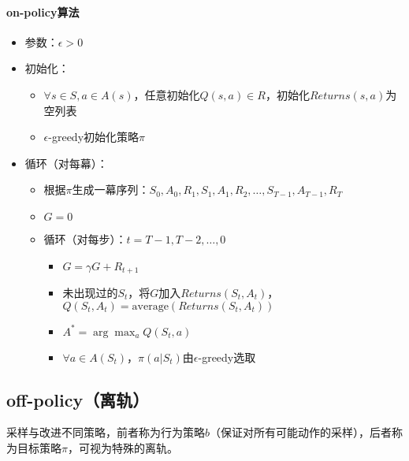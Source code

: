 \documentclass[
12pt, %
a4paper, 
oneside, %
headinclude,footinclude, %
]{scrartcl}
\begin{document}
\paragraph{on-policy算法}
\begin{itemize}
\item 参数：$ \epsilon > 0 $
\item 初始化：
\begin{itemize}
\item $ \forall s \in S, a \in A(s) $，任意初始化$ Q(s,a) \in R $，初始化$ Returns(s,a) $为空列表
\item $ \epsilon $-greedy初始化策略$ \pi $
\end{itemize}
\item 循环（对每幕）：
\begin{itemize}
\item 根据$ \pi $生成一幕序列：$ S_0,A_0,R_1,S_1,A_1,R_2,\dots,S_{T - 1},A_{T - 1},R_T $
\item $ G = 0 $
\item 循环（对每步）：$ t = T - 1, T - 2, \dots, 0 $
\begin{itemize}
\item $ G = \gamma G + R_{t + 1} $ 
\item 未出现过的$ S_t $，将$ G $加入$ Returns(S_t,A_t) $，$ Q(S_t,A_t) = \text{average}(Returns(S_t,A_t)) $
\item $ A^* = \arg \max_a Q(S_t,a) $
\item $ \forall a \in A(S_t) $，$ \pi(a|S_t) $由$ \epsilon $-greedy选取
\end{itemize}
\end{itemize}
\end{itemize}
\subsection{off-policy（离轨）}
采样与改进不同策略，前者称为行为策略$ b $（保证对所有可能动作的采样），后者称为目标策略$ \pi $，可视为特殊的离轨。
\end{document}
